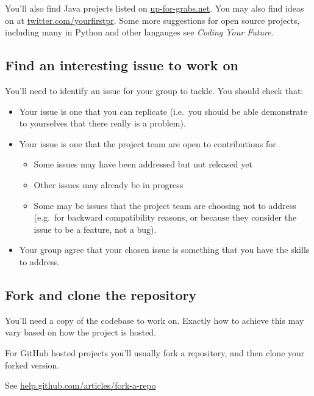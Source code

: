 \documentclass[
]{book}
\providecommand{\tightlist}{%
  \setlength{\itemsep}{0pt}\setlength{\parskip}{0pt}}
\begin{document}
You'll also find Java projects listed on \href{http://up-for-grabs.net}{up-for-grabs.net}. You may also find ideas on at \href{https://twitter.com/yourfirstpr}{twitter.com/yourfirstpr}. Some more suggestions for open source projects, including many in Python and other langauges see \emph{Coding Your Future}. \citep{experiencing}

\hypertarget{findanissue}{%
\subsection{Find an interesting issue to work on}\label{findanissue}}

You'll need to identify an issue for your group to tackle. You should check that:

\begin{itemize}
\tightlist
\item
  Your issue is one that you can replicate (i.e.~you should be able demonstrate to yourselves that there really is a problem).
\item
  Your issue is one that the project team are open to contributions for.

  \begin{itemize}
  \tightlist
  \item
    Some issues may have been addressed but not released yet
  \item
    Other issues may already be in progress
  \item
    Some may be issues that the project team are choosing not to address (e.g.~for backward compatibility reasons, or because they consider the issue to be a feature, not a bug).
  \end{itemize}
\item
  Your group agree that your chosen issue is something that you have the skills to address.
\end{itemize}

\hypertarget{forklone}{%
\subsection{Fork and clone the repository}\label{forklone}}

You'll need a copy of the codebase to work on. Exactly how to achieve this may vary based on how the project is hosted.

For GitHub hosted projects you'll usually fork a repository, and then clone your forked version.

See \href{https://help.github.com/articles/fork-a-repo/}{help.github.com/articles/fork-a-repo}
\end{document}
